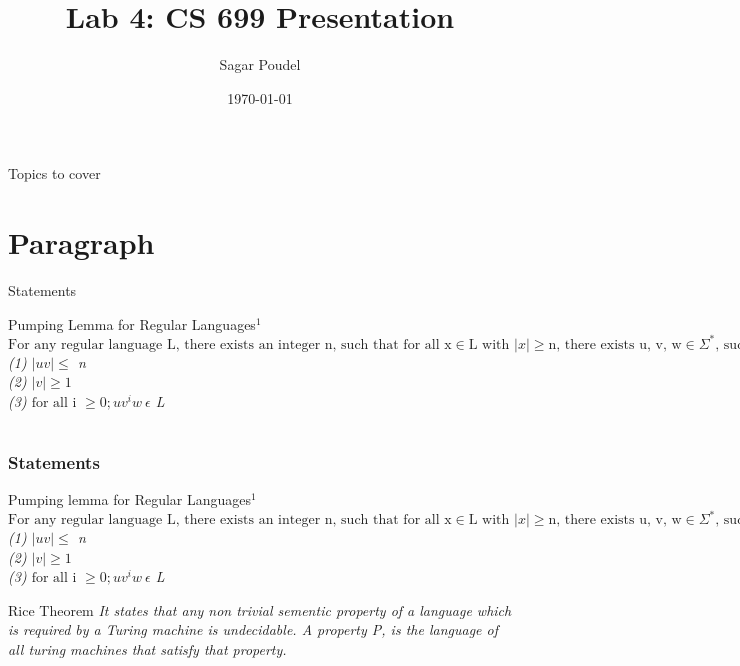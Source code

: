 \documentclass{beamer}
\title[ ]{Lab 4: CS 699 Presentation}
\author{Sagar Poudel}
\institute{IIT Bombay}
\date{\today}
\begin{document}
\frame{\titlepage}

\begin{frame}{Topics to cover}
    \tableofcontents
\end{frame}

\section{Paragraph}

\begin{frame}{Statements}
    
    \begin{block}{Pumping Lemma for Regular Languages$^{1}$}
       \emph{ $
        \text{For any regular language L, there exists an integer n, such that for all x} \in \text{L with } |x| \geq \text{n, there exists u, v, w} \in \Sigma^{*} \text{, such that x = uvw, and }$\\
        
        \emph{(1)} $ \left|uv\right| \leq $ n\\
        \emph{(2)} $\left|v\right| \geq 1 $\\
        \emph{(3)} $\text{for all i } \geq 0; uv^iw\ \epsilon{} $ L}
    \end{block}
\end{frame}

\section{}
\begin{frame}
    \frametitle{Statements}
    \begin{block}{Pumping lemma for Regular Languages$^{1}$}
    \emph{ $\text{For any regular language L, there exists an integer n, such that for all x} \in \text{L with } |x| \geq \text{n, there exists u, v, w} \in \Sigma^{*} \text{, such that x = uvw, and }$\\
    
         \emph{(1)} $ \left|uv\right| \leq $ n\\
        \emph{(2)} $\left|v\right| \geq 1 $\\
        \emph{(3)} $\text{for all i } \geq 0; uv^iw\ \epsilon{} $ L}
    \end{block}

    \begin{block}{Rice Theorem}
        \textit{It states that any non trivial sementic property of a language which is required by a Turing machine is undecidable. A property P, is the language of all turing machines that satisfy that property.}
    \end{block}
\end{frame}
\end{document}
